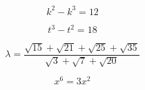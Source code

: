 \documentclass[11pt, twocolumn, landscape, a4paper]{article}
\begin{document}
$$
k^{2} - k^{3} = 12
$$

$$
t^{3} - t^{2} = 18
$$

$$
\lambda = \dfrac{\sqrt{15} + \sqrt{21} + \sqrt{25} + \sqrt{35}}{\sqrt{3} +  \sqrt{7} + \sqrt{20}}
$$


$$
x^{6} = 3x^{2}
$$
\end{document}

